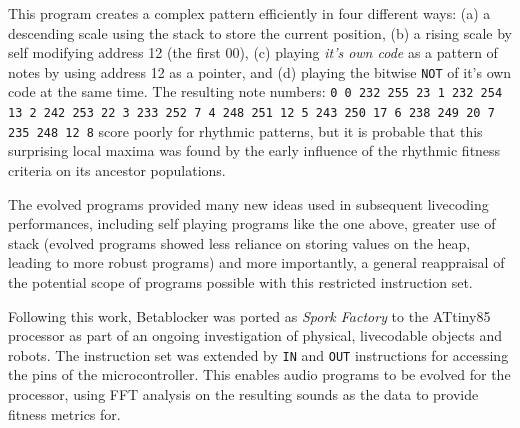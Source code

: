\documentclass[letterpaper, 12pt]{article}
\begin{document}
This program creates a complex pattern efficiently in four different ways:
 (a) a descending scale using the stack to store the current position,
 (b) a rising scale by self modifying address 12 (the first 00),
 (c) playing \emph{it's own code} as a pattern of notes by using address 12 as a pointer, and
 (d) playing the bitwise \texttt{NOT} of it's own code at the same time.
% 
% 
The resulting note numbers: \texttt{0 0 232 255 23 1 232 254 13 2 242 253 22 3 233 252 7 4 248 251 12 5 243 250 17 6 238 249 20 7 235 248 12 8} score poorly for rhythmic patterns, but it is probable that this surprising local maxima was found by the early influence of the rhythmic fitness criteria on its ancestor populations. 

The evolved programs provided many new ideas used in subsequent livecoding performances,  including self playing programs like the one above, greater use of stack (evolved programs showed less reliance on storing values on the heap, leading to more robust programs) and more importantly, a general reappraisal of the potential scope of programs possible with this restricted instruction set.

Following this work, Betablocker was ported as \emph{Spork Factory} to the ATtiny85 processor as part of an ongoing investigation of physical, livecodable objects and robots. 
The instruction set was extended by \texttt{IN} and \texttt{OUT} instructions for accessing the pins of the microcontroller. 
This enables audio programs to be evolved for the processor, using FFT analysis on the resulting sounds as the data to provide fitness metrics for.

\end{document}
